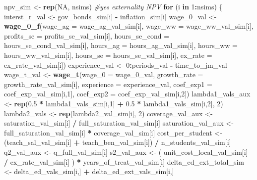\documentclass[]{article}
\newenvironment{Shaded}{\begin{snugshade}}{\end{snugshade}}
\newcommand{\CommentTok}[1]{\textcolor[rgb]{0.56,0.35,0.01}{\textit{#1}}}
\newcommand{\ControlFlowTok}[1]{\textcolor[rgb]{0.13,0.29,0.53}{\textbf{#1}}}
\newcommand{\DataTypeTok}[1]{\textcolor[rgb]{0.13,0.29,0.53}{#1}}
\newcommand{\DecValTok}[1]{\textcolor[rgb]{0.00,0.00,0.81}{#1}}
\newcommand{\FloatTok}[1]{\textcolor[rgb]{0.00,0.00,0.81}{#1}}
\newcommand{\KeywordTok}[1]{\textcolor[rgb]{0.13,0.29,0.53}{\textbf{#1}}}
\newcommand{\NormalTok}[1]{#1}
\newcommand{\OperatorTok}[1]{\textcolor[rgb]{0.81,0.36,0.00}{\textbf{#1}}}
\newcommand{\OtherTok}[1]{\textcolor[rgb]{0.56,0.35,0.01}{#1}}
\newcommand{\StringTok}[1]{\textcolor[rgb]{0.31,0.60,0.02}{#1}}
\begin{document}
\begin{Shaded}
\begin{Highlighting}[]
\NormalTok{npv_sim <-}\StringTok{ }\KeywordTok{rep}\NormalTok{(}\OtherTok{NA}\NormalTok{, nsims)}
\CommentTok{#yes externality NPV}
\ControlFlowTok{for}\NormalTok{ (i }\ControlFlowTok{in} \DecValTok{1}\OperatorTok{:}\NormalTok{nsims) \{}
\NormalTok{  interst_r_val <-}\StringTok{ }\NormalTok{gov_bonds_sim[i] }\OperatorTok{-}\StringTok{ }\NormalTok{inflation_sim[i]}
\NormalTok{  wage_}\DecValTok{0}\NormalTok{_val <-}\StringTok{ }\KeywordTok{wage_0_f}\NormalTok{(}\DataTypeTok{wage_ag =}\NormalTok{ wage_ag_val_sim[i], }
                       \DataTypeTok{wage_ww =}\NormalTok{ wage_ww_val_sim[i], }
                       \DataTypeTok{profits_se =}\NormalTok{ profits_se_val_sim[i], }
                       \DataTypeTok{hours_se_cond =}\NormalTok{ hours_se_cond_val_sim[i], }
                       \DataTypeTok{hours_ag =}\NormalTok{ hours_ag_val_sim[i], }
                       \DataTypeTok{hours_ww =}\NormalTok{ hours_ww_val_sim[i], }
                       \DataTypeTok{hours_se =}\NormalTok{ hours_se_val_sim[i], }
                       \DataTypeTok{ex_rate =}\NormalTok{ ex_rate_val_sim[i])  }
\NormalTok{  experience_val <-}\StringTok{ }\DecValTok{0}\OperatorTok{:}\NormalTok{periods_val }\OperatorTok{-}\StringTok{ }\NormalTok{time_to_jm_val}
\NormalTok{  wage_t_val <-}\StringTok{ }\KeywordTok{wage_t}\NormalTok{(}\DataTypeTok{wage_0 =}\NormalTok{ wage_}\DecValTok{0}\NormalTok{_val, }
                   \DataTypeTok{growth_rate =}\NormalTok{ growth_rate_val_sim[i], }
                   \DataTypeTok{experience =}\NormalTok{ experience_val, }
                   \DataTypeTok{coef_exp1 =}\NormalTok{ coef_exp_val_sim[i,}\DecValTok{1}\NormalTok{], }
                   \DataTypeTok{coef_exp2 =}\NormalTok{ coef_exp_val_sim[i,}\DecValTok{2}\NormalTok{])}
\NormalTok{  lambda1_vals_aux <-}\StringTok{ }\KeywordTok{rep}\NormalTok{(}\FloatTok{0.5} \OperatorTok{*}\StringTok{ }\NormalTok{lambda1_vals_sim[i,}\DecValTok{1}\NormalTok{] }\OperatorTok{+}\StringTok{ }\FloatTok{0.5} \OperatorTok{*}\StringTok{ }\NormalTok{lambda1_vals_sim[i,}\DecValTok{2}\NormalTok{], }\DecValTok{2}\NormalTok{)}
\NormalTok{  lambda2_vals <-}\StringTok{ }\KeywordTok{rep}\NormalTok{(lambda2_val_sim[i], }\DecValTok{2}\NormalTok{)}
\NormalTok{  coverage_val_aux <-}\StringTok{  }\NormalTok{saturation_val_sim[i] }\OperatorTok{/}\StringTok{ }\NormalTok{full_saturation_val_sim[i]}
\NormalTok{  saturation_val_aux <-}\StringTok{ }\NormalTok{full_saturation_val_sim[i] }\OperatorTok{*}\StringTok{ }\NormalTok{coverage_val_sim[i]}
\NormalTok{  cost_per_student <-}\StringTok{ }\NormalTok{(teach_sal_val_sim[i] }\OperatorTok{+}\StringTok{ }\NormalTok{teach_ben_val_sim[i]) }\OperatorTok{/}\StringTok{ }\NormalTok{n_students_val_sim[i]}
\NormalTok{  q2_val_aux <-}\StringTok{ }\NormalTok{q_full_val_sim[i]}
\NormalTok{  s2_val_aux <-}\StringTok{ }\NormalTok{( unit_cost_local_val_sim[i] }\OperatorTok{/}\StringTok{ }\NormalTok{ex_rate_val_sim[i] ) }\OperatorTok{*}\StringTok{ }\NormalTok{years_of_treat_val_sim[i]}
\NormalTok{  delta_ed_ext_total_sim <-}\StringTok{ }\NormalTok{delta_ed_vals_sim[i,] }\OperatorTok{+}\StringTok{ }\NormalTok{delta_ed_ext_vals_sim[i,]}
 

\end{Highlighting}
\end{Shaded}
\end{document}
